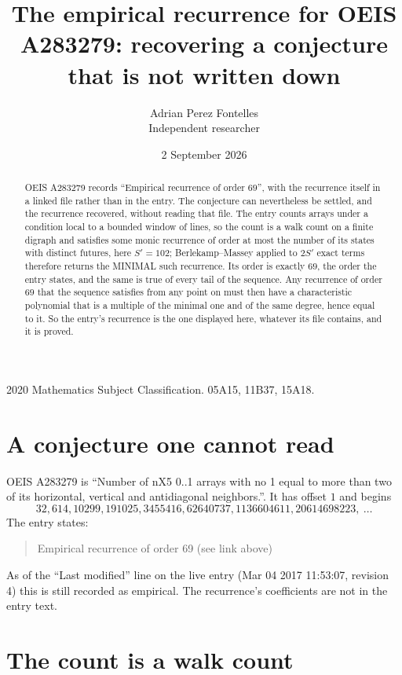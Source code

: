 \documentclass[11pt,a4paper]{article}
\title{The empirical recurrence for OEIS A283279: recovering a conjecture that is not written down}
\author{Adrian Perez Fontelles\\ \small Independent researcher}
\date{2 September 2026}
\theoremstyle{plain}
\theoremstyle{definition}
\begin{document}
\maketitle

\begin{abstract}
OEIS A283279 records ``Empirical recurrence of order $69$'', with the recurrence itself in a
linked file rather than in the entry. The conjecture can nevertheless be settled, and the
recurrence recovered, without reading that file. The entry counts arrays under a condition
local to a bounded window of lines, so the count is a walk count on a finite digraph and
satisfies some monic recurrence of order at most the number of its states with distinct
futures, here $S'=102$; Berlekamp--Massey applied to $2S'$ exact
terms therefore returns the MINIMAL such recurrence. Its order is exactly $69$, the order
the entry states, and the same is true of every tail of the sequence. Any recurrence of order
$69$ that the sequence satisfies from any point on must then have a characteristic
polynomial that is a multiple of the minimal one and of the same degree, hence equal to it. So
the entry's recurrence is the one displayed here, whatever its file contains, and it is
proved.
\end{abstract}

\noindent\small 2020 Mathematics Subject Classification. 05A15, 11B37, 15A18.\normalsize

\section{A conjecture one cannot read}

OEIS A283279 is ``Number of nX5 0..1 arrays with no 1 equal to more than two of its horizontal, vertical and antidiagonal neighbors.''. It has offset $1$ and begins
\[
32, 614, 10299, 191025, 3455416, 62640737, 1136604611, 20614698223,\ \dots
\]
The entry states:
\begin{quote}
Empirical recurrence of order 69 (see link above)
\end{quote}
As of the ``Last modified'' line on the live entry (Mar 04 2017 11:53:07, revision 4) this is still
recorded as empirical. The recurrence's coefficients are not in the entry text.

\section{The count is a walk count}
\end{document}
